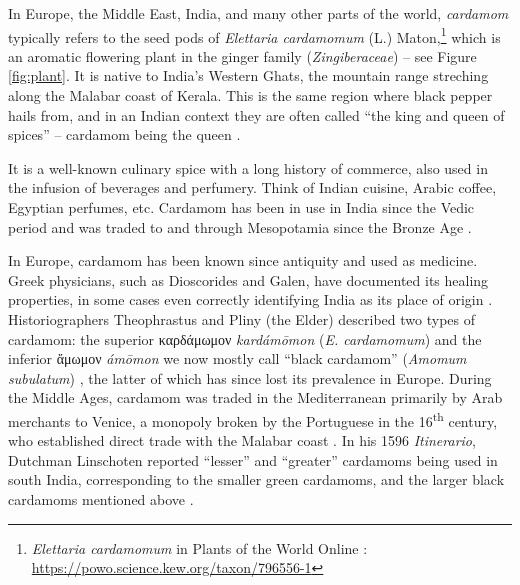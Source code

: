 \documentclass[12pt]{article}
\begin{document}

In Europe, the Middle East, India, and many other parts of the world, \textit{cardamom} typically refers to the seed pods of \textit{Elettaria cardamomum} (L.) Maton,\footnote{\textit{Elettaria cardamomum} in Plants of the World Online \parencite{powo}: \url{https://powo.science.kew.org/taxon/796556-1}} which is an aromatic flowering plant in the ginger family (\textit{Zingiberaceae}) -- see Figure \ref{fig:plant}. It is native to India's Western Ghats, the mountain range streching along the Malabar coast of Kerala. This is the same region where black pepper hails from, and in an Indian context they are often called ``the king and queen of spices'' -- cardamom being the queen \parencite{nair_2020_geographya}. 

It is a well-known culinary spice with a long history of commerce, also used in the infusion of beverages and perfumery. Think of Indian cuisine, Arabic coffee, Egyptian perfumes, etc. Cardamom has been in use in India since the Vedic period and was traded to and through Mesopotamia since the Bronze Age \parencite{ravindran_2002_cardamom}. 

In Europe, cardamom has been known since antiquity and used as medicine. Greek physicians, such as Dioscorides and Galen, have documented its healing properties, in some cases even correctly identifying India as its place of origin \parencites{parry_1969_spices}{anderson_2023_history}. Historiographers Theophrastus and Pliny (the Elder) described two types of cardamom: the superior καρδάμωμον \textit{kardámōmon} (\textit{E. cardamomum}) and the inferior ἄμωμον \textit{ámōmon} we now mostly call ``black cardamom'' (\textit{Amomum subulatum}) \parencite{prance_2005_cultural}, the latter of which has since lost its prevalence in Europe. During the Middle Ages, cardamom was traded in the Mediterranean primarily by Arab merchants to Venice, a monopoly broken by the Portuguese in the 16\textsuperscript{th} century, who established direct trade with the Malabar coast \parencite{cumo_2013_encyclopedia}. In his 1596 \textit{Itinerario}, Dutchman Linschoten reported ``lesser'' and ``greater'' cardamoms being used in south India, corresponding to the smaller green cardamoms, and the larger black cardamoms mentioned above \parencite{nair_2006_agronomy}.
\end{document}
